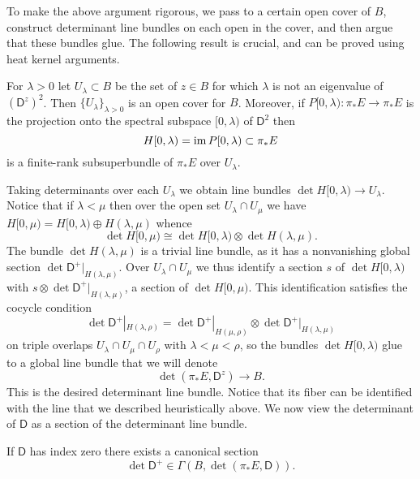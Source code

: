 \documentclass{amsart}
\renewcommand\d{\mathsf{D}}
\begin{document}
To make the above argument rigorous, we pass to a certain open cover of $B$, construct
determinant line bundles on each open in the cover, and then argue that these bundles glue.
The following result is crucial, and can be proved using heat kernel arguments.
\begin{lemma}
    For $\lambda>0$ let $U_\lambda\subset B$ be the set of $z\in B$ for which $\lambda$ is
    not an eigenvalue of $(\d^z)^2$. Then $\{U_\lambda\}_{\lambda>0}$ is an open cover for
    $B$. Moreover, if $P[0,\lambda):\pi_*E\to\pi_*E$ is the projection onto the spectral subspace
    $[0,\lambda)$ of $\d^2$ then
    \begin{equation*}
        H[0,\lambda) = \operatorname{im} P[0,\lambda)\subset \pi_*E
    \end{equation*}
    is a finite-rank subsuperbundle of $\pi_*E$ over $U_\lambda$.
\end{lemma}
Taking determinants over each $U_\lambda$ we obtain line bundles $\det H[0,\lambda)\to U_\lambda$.
Notice that if $\lambda<\mu$ then over the open set $U_\lambda\cap U_\mu$ we have
$H[0,\mu)=H[0,\lambda) \oplus H(\lambda,\mu)$ whence
\begin{equation*}
    \det H[0,\mu) \cong \det H[0,\lambda) \otimes \det H(\lambda,\mu).
\end{equation*}
The bundle $\det H(\lambda,\mu)$ is a trivial line bundle, as it has a nonvanishing global
section $\det \d^+|_{H(\lambda,\mu)}$. Over $U_\lambda\cap U_\mu$ we thus identify a section
$s$ of $\det H[0,\lambda)$ with $s\otimes \det \d^+|_{H(\lambda,\mu)}$, a section of
$\det H[0,\mu)$. This identification satisfies the cocycle condition
\begin{equation*}
    \det \d^+|_{H(\lambda,\rho)} = \det\d^+|_{H(\mu,\rho)} \otimes \det \d^+|_{H(\lambda,\mu)}
\end{equation*}
on triple overlaps $U_\lambda\cap U_\mu\cap U_\rho$ with $\lambda<\mu<\rho$, so the bundles
$\det H[0,\lambda)$ glue to a global line bundle that we will denote
\begin{equation*}
    \det(\pi_*E,\d^z)\to B.
\end{equation*}
This is the desired determinant line bundle. Notice that its fiber can be identified with
the line that we described heuristically above. We now view the determinant of $\d$ as
a section of the determinant line bundle.
\begin{corollary}
    If $\d$ has index zero there exists a canonical section
    \begin{equation*}
        \det \d^+ \in \Gamma(B, \det(\pi_*E,\d)).
    \end{equation*}
\end{corollary}
\end{document}
